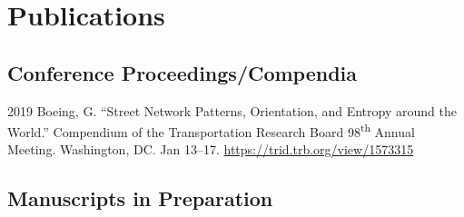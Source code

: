 \documentclass[12pt,letterpaper]{report}
\begin{document}
    \section*{Publications}

%
%    	
%
%
%
%
%
%
%
%
%
%



    \subsection*{Conference Proceedings/Compendia}

    \begin{tablist}

        \item[2019] \tab Boeing, G. \enquote{Street Network Patterns, Orientation, and Entropy around the World.} Compendium of the Transportation Research Board 98\textsuperscript{th} Annual Meeting. Washington, DC. Jan 13--17. \href{https://trid.trb.org/view/1573315}{https://trid.trb.org/view/1573315}

    \end{tablist}


%

    \subsection*{Manuscripts in Preparation}
\end{document}
